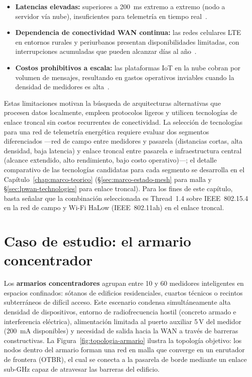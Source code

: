 \begin{itemize}
    \item \textbf{Latencias elevadas:} superiores a 200~ms extremo a extremo (nodo a servidor vía nube), insuficientes para telemetría en tiempo real~\cite{laghariInternetThingsIoT2024}.
    \item \textbf{Dependencia de conectividad WAN continua:} las redes celulares LTE en entornos rurales y periurbanos presentan disponibilidades limitadas, con interrupciones acumuladas que pueden alcanzar días al año~\cite{laghariInternetThingsIoT2024}.
    \item \textbf{Costos prohibitivos a escala:} las plataformas IoT en la nube cobran por volumen de mensajes, resultando en gastos operativos inviables cuando la densidad de medidores es alta~\cite{alsafranChallengesImplementingIoT2025,alsuwaidiSecuringSmartGrid2024}.
\end{itemize}

Estas limitaciones motivan la búsqueda de arquitecturas alternativas que procesen datos localmente, empleen protocolos ligeros y utilicen tecnologías de enlace troncal sin costos recurrentes de conectividad. La selección de tecnologías para una red de telemetría energética requiere evaluar dos segmentos diferenciados ---red de campo entre medidores y pasarela (distancias cortas, alta densidad, baja latencia) y enlace troncal entre pasarela e infraestructura central (alcance extendido, alto rendimiento, bajo costo operativo)---; el detalle comparativo de las tecnologías candidatas para cada segmento se desarrolla en el Capítulo~\ref{chap:marco-teorico} (§\ref{sec:marco-estado-mesh} para malla y §\ref{sec:lpwan-technologies} para enlace troncal). Para los fines de este capítulo, basta señalar que la combinación seleccionada es Thread~1.4 sobre IEEE~802.15.4 en la red de campo y Wi-Fi HaLow (IEEE~802.11ah) en el enlace troncal.


\section{Caso de estudio: el armario concentrador}
\label{sec:escenario-armarios}

Los \textbf{armarios concentradores} agrupan entre 10 y 60 medidores inteligentes en espacios confinados: sótanos de edificios residenciales, cuartos técnicos o recintos subterráneos de difícil acceso. Este escenario condensa simultáneamente alta densidad de dispositivos, entorno de radiofrecuencia hostil (concreto armado e interferencia eléctrica), alimentación limitada al puerto auxiliar 5\,V del medidor (200~mA disponibles) y necesidad de salida hacia la WAN a través de barreras constructivas. La Figura~\ref{fig:topologia-armario} ilustra la topología objetivo: los nodos dentro del armario forman una red en malla que converge en un enrutador de frontera (OTBR), el cual se conecta a la pasarela de borde mediante un enlace sub-GHz capaz de atravesar las barreras del edificio.

